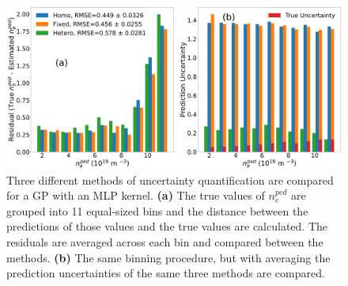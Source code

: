 \documentclass[a4paper, twoside, final, 12pt]{article}
\begin{document}
{

\begin{figure}
	\centering
	\includegraphics[scale=0.2]{./src/MLP_comp_v2}
	\caption{Three different methods of uncertainty quantification are compared for a GP with an MLP kernel. \textbf{(a)} The true values of $n_e^{ped}$ are grouped into 11 equal-sized bins and the distance between the predictions of those values and the true values are calculated. The residuals are averaged across each bin and compared between the methods. \textbf{(b)} The same binning procedure, but with averaging the prediction uncertainties of the same three methods are compared.}
	\label{fig:MLP_UQ}
\end{figure}


}
\end{document}
